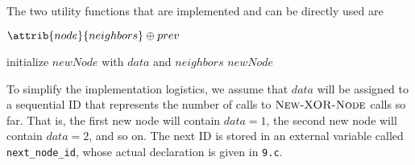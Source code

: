 \newpage

The two utility functions that are implemented and can be directly used are
\begin{codebox}
\li \Return $\attrib{node}{neighbors} \oplus prev$
\End
\end{codebox}

\begin{codebox}
\li initialize $newNode$ with $data$ and $neighbors$
\li \Return $newNode$
\End
\end{codebox}

To simplify the implementation logistics, we assume that $data$ will be assigned to a sequential ID that represents the number of calls to $\textsc{New-XOR-Node}$ calls so far. That is, the first new node will contain $data = 1$, the second new node will contain $data = 2$, and so on. The next ID is stored in an external variable called \texttt{next\_node\_id}, whose actual declaration is given in \texttt{9.c}.

